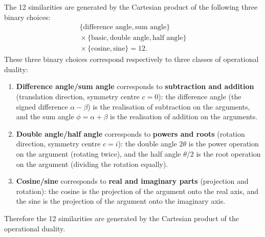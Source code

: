 \begin{lemma}\label{lem:similarity_generation}
The 12 similarities are generated by the Cartesian product of the following three binary choices:
\[
\begin{gathered}\{\text{difference angle}, \text{sum angle}\}\\{}\times \{\text{basic}, \text{double angle}, \text{half angle}\}\\{}\times \{\text{cosine}, \text{sine}\} = 12.\end{gathered}
\]
These three binary choices correspond respectively to three classes of operational duality:
\begin{enumerate}[label=(\roman*)]
    \item \textbf{Difference angle/sum angle} corresponds to \textbf{subtraction and addition} (translation direction, symmetry centre $c=0$): the difference angle (the signed difference $\alpha - \beta$) is the realisation of subtraction on the arguments, and the sum angle $\phi = \alpha + \beta$ is the realisation of addition on the arguments.
    \item \textbf{Double angle/half angle} corresponds to \textbf{powers and roots} (rotation direction, symmetry centre $c=i$): the double angle $2\theta$ is the power operation on the argument (rotating twice), and the half angle $\theta/2$ is the root operation on the argument (dividing the rotation equally).
    \item \textbf{Cosine/sine} corresponds to \textbf{real and imaginary parts} (projection and rotation): the cosine is the projection of the argument onto the real axis, and the sine is the projection of the argument onto the imaginary axis.
\end{enumerate}
Therefore the 12 similarities are generated by the Cartesian product of the operational duality.
\end{lemma}

